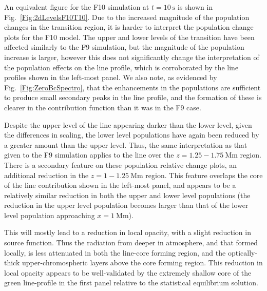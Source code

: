 An equivalent figure for the F10 simulation at $t=\SI{10}{\second}$ is shown in Fig.~\ref{Fig:2dLevelsF10T10}.
Due to the increased magnitude of the population changes in the transition region, it is harder to interpret the population change plots for the F10 model.
The upper and lower levels of the \Ha{} transition have been affected similarly to the F9 simulation, but the magnitude of the population increase is larger, however this does not significantly change the interpretation of the population effects on the line profile, which is corroborated by the line profiles shown in the left-most panel.
We also note, as evidenced by Fig.~\ref{Fig:ZeroBcSpectro}, that the enhancements in the \Ha{} populations are sufficient to produce small secondary peaks in the line profile, and the formation of these is clearer in the contribution function than it was in the F9 case.

Despite the upper level of the \CaLine{} line appearing darker than the lower level, given the differences in scaling, the lower level populations have again been reduced by a greater amount than the upper level.
Thus, the same interpretation as that given to the F9 simulation applies to the \CaLine{} line over the $z=1.25-\SI{1.75}{\mega\metre}$ region.
There is a secondary feature on these \Caii{} population relative change plots, an additional reduction in the $z=1-\SI{1.25}{\mega\metre}$ region.
This feature overlaps the core of the line contribution shown in the left-most panel, and appears to be a relatively similar reduction in both the upper and lower level populations (the reduction in the upper level population becomes larger than that of the lower level population approaching $x=\SI{1}{\mega\metre}$).

This will mostly lead to a reduction in local opacity, with a slight reduction in source function.
Thus the radiation from deeper in atmosphere, and that formed locally, is less attenuated in both the line-core forming region, and the optically-thick upper-chromospheric layers above the core forming region.
This reduction in local opacity appears to be well-validated by the extremely shallow core of the green line-profile in the first panel relative to the statistical equilibrium solution.



